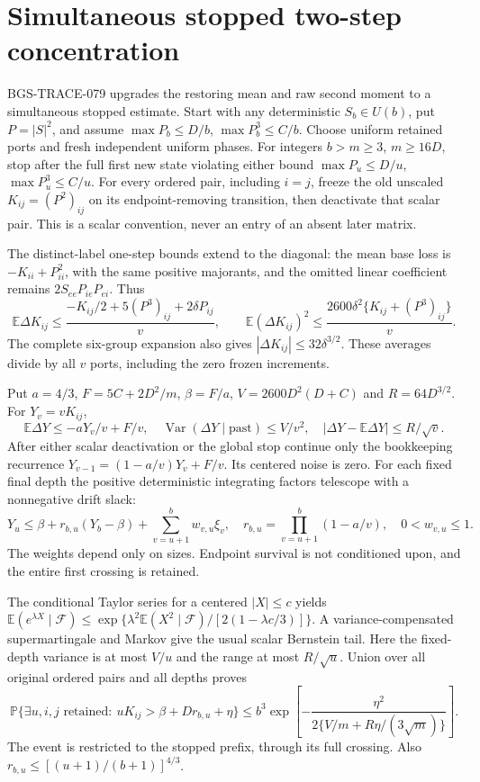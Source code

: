 \section{Simultaneous stopped two-step concentration}
\label{sec:stopped-two-step-20261013}

BGS-TRACE-079 upgrades the restoring mean and raw second moment to a
simultaneous stopped estimate. Start with any deterministic $S_b\in U(b)$,
put $P=|S|^2$, and assume $\max P_b\le D/b$, $\max P_b^3\le C/b$.
Choose uniform retained ports and fresh independent uniform phases.
For integers $b>m\ge3$, $m\ge16D$, stop after the full first new state
violating either bound $\max P_u\le D/u$, $\max P_u^3\le C/u$.
For every ordered pair, including $i=j$, freeze the old unscaled
$K_{ij}=(P^2)_{ij}$ on its endpoint-removing transition, then deactivate
that scalar pair. This is a scalar convention, never an entry of an
absent later matrix.

The distinct-label one-step bounds extend to the diagonal: the mean base
loss is $-K_{ii}+P_{ii}^2$, with the same positive majorants, and the
omitted linear coefficient remains $2S_{ee}P_{ie}P_{ei}$. Thus
\[
 \mathbb E\Delta K_{ij}\le
 \frac{-K_{ij}/2+5(P^3)_{ij}+2\delta P_{ij}}v,
 \qquad
 \mathbb E(\Delta K_{ij})^2\le
 \frac{2600\delta^2\{K_{ij}+(P^3)_{ij}\}}v.       \tag{SF.1}
\]
The complete six-group expansion also gives
$|\Delta K_{ij}|\le32\delta^{3/2}$. These averages divide by all $v$
ports, including the zero frozen increments.

Put $a=4/3$, $F=5C+2D^2/m$, $\beta=F/a$,
$V=2600D^2(D+C)$ and $R=64D^{3/2}$. For $Y_v=vK_{ij}$,
\[
 \mathbb E\Delta Y\le-aY_v/v+F/v,\quad
 \operatorname{Var}(\Delta Y\mid\mathrm{past})\le V/v^2,
 \quad |\Delta Y-\mathbb E\Delta Y|\le R/\sqrt v.       \tag{SF.2}
\]
After either scalar deactivation or the global stop continue only the
bookkeeping recurrence $Y_{v-1}=(1-a/v)Y_v+F/v$. Its centered noise is
zero. For each fixed final depth the positive deterministic integrating
factors telescope with a nonnegative drift slack:
\[
 Y_u\le\beta+r_{b,u}(Y_b-\beta)+\sum_{v=u+1}^b w_{v,u}\xi_v,
 \quad r_{b,u}=\prod_{v=u+1}^b(1-a/v),\quad 0<w_{v,u}\le1.       \tag{SF.3}
\]
The weights depend only on sizes. Endpoint survival is not conditioned
upon, and the entire first crossing is retained.

The conditional Taylor series for a centered $|X|\le c$ yields
$\mathbb E(e^{\lambda X}\mid\mathcal F)
\le\exp\{\lambda^2\mathbb E(X^2\mid\mathcal F)/[2(1-\lambda c/3)]\}$.
A variance-compensated supermartingale and Markov give the usual scalar
Bernstein tail. Here the fixed-depth variance is at most $V/u$ and the
range at most $R/\sqrt u$. Union over all original ordered pairs and
all depths proves
\[
 \mathbb P\{\exists u,i,j\text{ retained}:\ uK_{ij}>
                       \beta+Dr_{b,u}+\eta\}
 \le b^3\exp\!\left[-\frac{\eta^2}
                  {2\{V/m+R\eta/(3\sqrt m)\}}\right].        \tag{SF.4}
\]
The event is restricted to the stopped prefix, through its full crossing.
Also $r_{b,u}\le[(u+1)/(b+1)]^{4/3}$.

